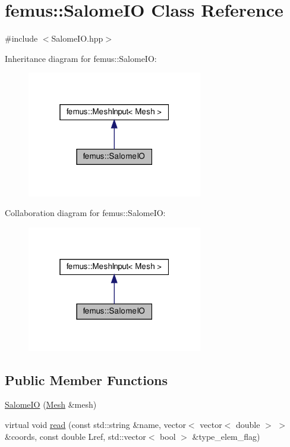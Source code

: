 \hypertarget{classfemus_1_1_salome_i_o}{}\section{femus\+:\+:Salome\+IO Class Reference}
\label{classfemus_1_1_salome_i_o}


{\ttfamily \#include $<$Salome\+I\+O.\+hpp$>$}



Inheritance diagram for femus\+:\+:Salome\+IO\+:
\nopagebreak
\begin{figure}[H]
\begin{center}
\leavevmode
\includegraphics[width=217pt]{classfemus_1_1_salome_i_o__inherit__graph}
\end{center}
\end{figure}


Collaboration diagram for femus\+:\+:Salome\+IO\+:
\nopagebreak
\begin{figure}[H]
\begin{center}
\leavevmode
\includegraphics[width=217pt]{classfemus_1_1_salome_i_o__coll__graph}
\end{center}
\end{figure}
\subsection*{Public Member Functions}
\begin{DoxyCompactItemize}
\item 
\mbox{\hyperlink{classfemus_1_1_salome_i_o_a6ccc4b0e60f801d79a60484e894bc056}{Salome\+IO}} (\mbox{\hyperlink{classfemus_1_1_mesh}{Mesh}} \&mesh)
\item 
virtual void \mbox{\hyperlink{classfemus_1_1_salome_i_o_a2cd7f5327fe664747acc0131bf6a657e}{read}} (const std\+::string \&name, vector$<$ vector$<$ double $>$ $>$ \&coords, const double Lref, std\+::vector$<$ bool $>$ \&type\+\_\+elem\+\_\+flag)
\end{DoxyCompactItemize}
